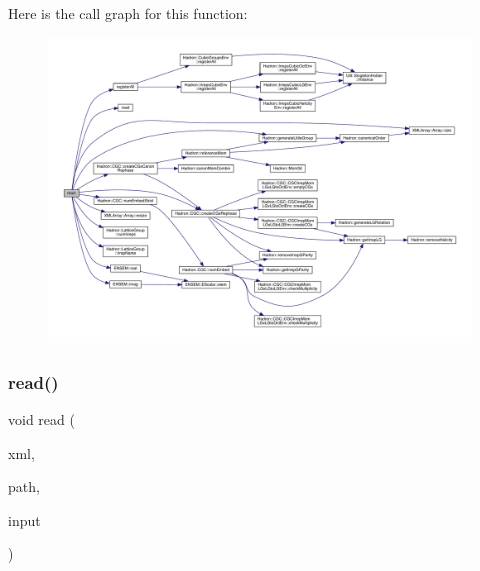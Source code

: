 Here is the call graph for this function\+:
\nopagebreak
\begin{figure}[H]
\begin{center}
\leavevmode
\includegraphics[width=350pt]{d9/d31/adat-devel_2main_2irreputils_2cgs__table__hardcode_8cc_a3c04138a5bfe5d72780bb7e82a18e627_cgraph}
\end{center}
\end{figure}
\mbox{\label{adat-devel_2main_2irreputils_2cgs__table__hardcode_8cc_a0bc6eab6ee4938b14f32a0a933d96dd9}} 
\subsubsection{\texorpdfstring{read()}{read()}}
{\footnotesize\ttfamily void read (\begin{DoxyParamCaption}\item[{X\+M\+L\+Reader \&}]{xml,  }\item[{const string \&}]{path,  }\item[{\mbox{\hyperlink{structtest__cgs__t}{test\+\_\+cgs\+\_\+t}} \&}]{input }\end{DoxyParamCaption})}

